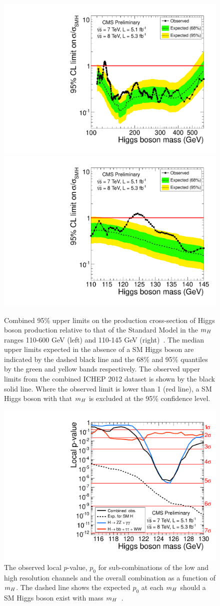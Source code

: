 \begin{figure}
\begin{center}
 \includegraphics[width=.49\textwidth]{combinations/ichep2012/Figure_004-a.pdf}
 \includegraphics[width=.49\textwidth]{combinations/ichep2012/Figure_004-b.pdf}
\end{center}
 \caption{Combined 95\% upper limits on the production cross-section of Higgs boson
production relative to that of the Standard Model in the $m_{H}$ ranges 110-600 GeV (left)
and 110-145 GeV (right)~\citep{HIG-12-020}. The median upper limits expected in the absence of a SM Higgs boson  
are indicated by the dashed black line and the 68\% and 95\% quantiles by the green and yellow
bands respectively.
The observed upper limits from the combined ICHEP 2012 dataset is shown by the black solid line.
Where the observed limit is lower than 1 (red line), a SM Higgs boson with that $m_{H}$ 
is excluded at the 95\% confidence level.}
\label{fig:combinedexcl}
\end{figure}

\begin{figure}
\begin{center}
\includegraphics[width=.8\textwidth]{combinations/ichep2012/sqr_pvala_all_byresol.pdf}
\end{center}
\caption{The observed local $p$-value, $p_{0}$ for sub-combinations of the low and
high resolution channels and the overall combination as a function of $m_{H}$. The dashed
line shows the expected $p_{0}$ at each $m_{H}$ should a SM Higgs boson exist with mass $m_{H}$~\citep{HIG-12-020}.}
\label{fig:combinedpval}
\end{figure}


